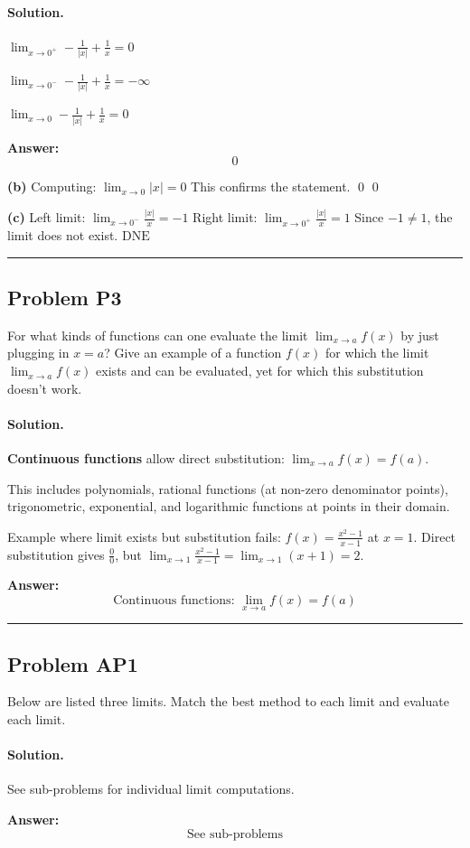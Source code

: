 \documentclass[12pt, a4paper]{article}
\newcommand{\problem}[1]{\subsection*{Problem #1}}
\newcommand{\solution}{\paragraph{Solution.}}
\begin{document}
\solution

$\lim_{x \to 0^+} - \frac{1}{\left|{x}\right|} + \frac{1}{x} = 0$

$\lim_{x \to 0^-} - \frac{1}{\left|{x}\right|} + \frac{1}{x} = -\infty$

$\lim_{x \to 0} - \frac{1}{\left|{x}\right|} + \frac{1}{x} = 0$

\textbf{Answer:}
\[\boxed{0}\]

\textbf{(b)}
Computing: $\lim_{x \to 0} \left|{x}\right| = 0$
This confirms the statement. \qed
$\boxed{0}$

\textbf{(c)}
Left limit: $\lim_{x \to 0^-} \frac{\left|{x}\right|}{x} = -1$
Right limit: $\lim_{x \to 0^+} \frac{\left|{x}\right|}{x} = 1$
Since $-1 \neq 1$, the limit does not exist.
$\boxed{\text{DNE}}$

\vspace{1em}
\hrule
\vspace{1em}

\problem{P3}

For what kinds of functions can one evaluate the limit $\lim_{x \to a} f(x)$ by just plugging in $x = a$? Give an example of a function $f(x)$ for which the limit $\lim_{x \to a} f(x)$ exists and can be evaluated, yet for which this substitution doesn't work.

\solution

\textbf{Continuous functions} allow direct substitution: $\lim_{x \to a} f(x) = f(a)$.

This includes polynomials, rational functions (at non-zero denominator points), trigonometric, exponential, and logarithmic functions at points in their domain.

Example where limit exists but substitution fails: $f(x) = \frac{x^2 - 1}{x - 1}$ at $x = 1$. Direct substitution gives $\frac{0}{0}$, but $\lim_{x \to 1} \frac{x^2-1}{x-1} = \lim_{x \to 1}(x+1) = 2$.

\textbf{Answer:}
\[\boxed{\text{Continuous functions: } \lim_{x \to a} f(x) = f(a)}\]

\vspace{1em}
\hrule
\vspace{1em}

\problem{AP1}

Below are listed three limits. Match the best method to each limit and evaluate each limit.

\solution

See sub-problems for individual limit computations.

\textbf{Answer:}
\[\boxed{\text{See sub-problems}}\]
\end{document}
